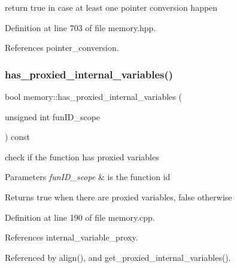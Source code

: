 return true in case at least one pointer conversion happen 



Definition at line 703 of file memory.\+hpp.



References pointer\+\_\+conversion.

\mbox{\label{classmemory_a792d6586b289c275ef9728053681bc08}} 
\subsubsection{\texorpdfstring{has\+\_\+proxied\+\_\+internal\+\_\+variables()}{has\_proxied\_internal\_variables()}}
{\footnotesize\ttfamily bool memory\+::has\+\_\+proxied\+\_\+internal\+\_\+variables (\begin{DoxyParamCaption}\item[{unsigned int}]{fun\+I\+D\+\_\+scope }\end{DoxyParamCaption}) const}



check if the function has proxied variables 


\begin{DoxyParams}{Parameters}
{\em fun\+I\+D\+\_\+scope} & is the function id \\
\hline
\end{DoxyParams}
\begin{DoxyReturn}{Returns}
true when there are proxied variables, false otherwise 
\end{DoxyReturn}


Definition at line 190 of file memory.\+cpp.



References internal\+\_\+variable\+\_\+proxy.



Referenced by align(), and get\+\_\+proxied\+\_\+internal\+\_\+variables().

